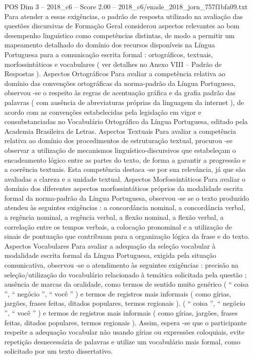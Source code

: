 \begin{textsample}{POS Dim 3 – 2018\_c6 – Score 2.00 – 2018\_c6/enade\_2018\_jorn\_757f1bfa09.txt}
Para atender a essas exigências, o padrão de resposta utilizado na avaliação das questões discursivas de Formação Geral considerou aspectos relevantes ao bom desempenho linguístico como competências distintas, de modo a permitir um mapeamento detalhado do domínio dos recursos disponíveis na Língua Portuguesa para a comunicação escrita formal : ortográficos, textuais, morfossintáticos e vocabulares ( ver detalhes no Anexo VIII – Padrão de Respostas ).
Aspectos Ortográficos Para avaliar a competência relativa ao domínio das convenções ortográficas da norma-padrão da Língua Portuguesa, observou -se o respeito às regras de acentuação gráfica e da grafia padrão das palavras ( com ausência de abreviaturas próprias da linguagem da internet ), de acordo com as convenções estabelecidas pela legislação em vigor e consubstanciadas no Vocabulário Ortográfico da Língua Portuguesa, editado pela Academia Brasileira de Letras.
Aspectos Textuais Para avaliar a competência relativa ao domínio dos procedimentos de estruturação textual, procurou -se observar a utilização de mecanismos linguístico-discursivos que estabeleçam o encadeamento lógico entre as partes do texto, de forma a garantir a progressão e a coerência textuais.
Esta competência destaca -se por sua relevância, já que são avaliadas a clareza e a unidade textual.
Aspectos Morfossintáticos Para avaliar o domínio dos diferentes aspectos morfossintáticos próprios da modalidade escrita formal da norma-padrão da Língua Portuguesa, observou -se se o texto produzido atendeu às seguintes exigências : a concordância nominal, a concordância verbal, a regência nominal, a regência verbal, a flexão nominal, a flexão verbal, a correlação entre os tempos verbais, a colocação pronominal e a utilização de sinais de pontuação que contribuam para a organização lógica da frase e do texto.
Aspectos Vocabulares Para avaliar a adequação da seleção vocabular à modalidade escrita formal da Língua Portuguesa, exigida pela situação comunicativa, observou -se o atendimento às seguintes exigências : precisão na seleção/utilização do vocabulário relacionado à temática solicitada pela questão ; ausência de marcas da oralidade, como termos de sentido muito genérico ( “ coisa ”, “ negócio ”, “ você ” ) e termos de registros mais informais ( como gírias, jargões, frases feitas, ditados populares, termos regionais ). ( “ coisa ”, “ negócio ”, “ você ” ) e termos de registros mais informais ( como gírias, jargões, frases feitas, ditados populares, termos regionais ).
Assim, espera -se que o participante respeite a adequação vocabular não usando gírias ou expressões coloquiais, evite repetição desnecessária de palavras e utilize um vocabulário mais formal, como solicitado por um texto dissertativo.

\end{textsample}

